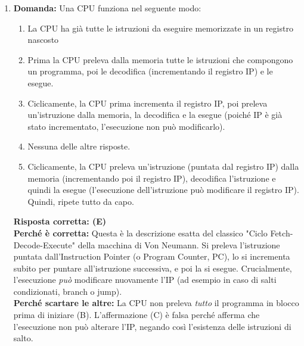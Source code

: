 \documentclass[12pt, a4paper]{article}
\begin{document}
\begin{enumerate}
    \item \textbf{Domanda:} Una CPU funziona nel seguente modo:
    \begin{enumerate}[label=(\Alph*)]
        \item La CPU ha già tutte le istruzioni da eseguire memorizzate in un registro nascosto
        \item Prima la CPU preleva dalla memoria tutte le istruzioni che compongono un programma, poi le decodifica (incrementando il registro IP) e le esegue.
        \item Ciclicamente, la CPU prima incrementa il registro IP, poi preleva un'istruzione dalla memoria, la decodifica e la esegue (poiché IP è già stato incrementato, l'esecuzione non può modificarlo).
        \item Nessuna delle altre risposte.
        \item Ciclicamente, la CPU preleva un'istruzione (puntata dal registro IP) dalla memoria (incrementando poi il registro IP), decodifica l'istruzione e quindi la esegue (l'esecuzione dell'istruzione può modificare il registro IP). Quindi, ripete tutto da capo.
    \end{enumerate}
    \textbf{Risposta corretta: (E)} \\
    \textbf{Perché è corretta:} Questa è la descrizione esatta del classico "Ciclo Fetch-Decode-Execute" della macchina di Von Neumann. Si preleva l'istruzione puntata dall'Instruction Pointer (o Program Counter, PC), lo si incrementa subito per puntare all'istruzione successiva, e poi la si esegue. Crucialmente, l'esecuzione \textit{può} modificare nuovamente l'IP (ad esempio in caso di salti condizionati, branch o jump). \\
    \textbf{Perché scartare le altre:} La CPU non preleva \textit{tutto} il programma in blocco prima di iniziare (B). L'affermazione (C) è falsa perché afferma che l'esecuzione non può alterare l'IP, negando così l'esistenza delle istruzioni di salto.


\end{enumerate}
\end{document}
